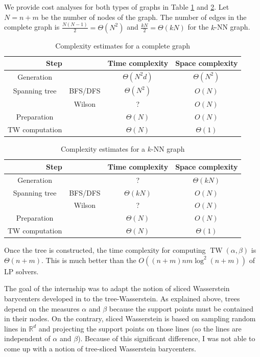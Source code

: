 \documentclass[12pt]{report}
\theoremstyle{definition}
\theoremstyle{remark}
\DeclareMathOperator{\tw}{TW}
\begin{document}
We provide cost analyses for both types of graphs in Table \ref{tab:2} and \ref{tab:3}. Let $N=n+m$ be the number of nodes of the graph. The number of edges in the complete graph is $\frac{N(N-1)}2=\Theta(N^2)$ and $\frac{kN}2=\Theta(kN)$ for the $k$-NN graph.

\begin{table}[H]
\centering
\begin{tabular}{|c|c|c|c|}
  \hline
    \multicolumn{2}{|c|}{Step} & Time complexity & Space complexity\\ \hline 
   Generation & & $\Theta(N^2d)$ & $\Theta(N^2)$\\
   Spanning tree & BFS/DFS & $\Theta(N^2)$ & $O(N)$ \\
    & Wilson & ? & $O(N)$ \\
    Preparation & & $\Theta(N)$ & $O(N)$\\
    TW computation & & $\Theta(N)$ & $\Theta(1)$\\
   \hline
\end{tabular}
\caption{Complexity estimates for a complete graph \label{tab:2}}
\end{table}

\begin{table}[H]
\centering
\begin{tabular}{|c|c|c|c|}
  \hline
    \multicolumn{2}{|c|}{Step} & Time complexity & Space complexity\\ \hline 
   Generation & & ? & $\Theta(kN)$\\
   Spanning tree & BFS/DFS & $\Theta(kN)$ & $O(N)$ \\
    & Wilson & ? & $O(N)$ \\
    Preparation & & $\Theta(N)$ & $O(N)$\\
    TW computation & & $\Theta(N)$ & $\Theta(1)$\\
   \hline
\end{tabular}
\caption{Complexity estimates for a $k$-NN graph \label{tab:3}}
\end{table}

Once the tree is constructed, the time complexity for computing $\tw(\alpha,\beta)$ is $\Theta(n+m)$. This is much better than the $O((n+m)nm \log^2(n+m))$ of LP solvers.
\\
\par The goal of the internship was to adapt the notion of sliced Wasserstein barycenters developed in \cite{bonneel2015sliced} to the tree-Wasserstein. As explained above, trees depend on the measures $\alpha$ and $\beta$ because the support points must be contained in their nodes. On the contrary, sliced Wasserstein is based on sampling random lines in $\mathbb R^d$ and projecting the support points on those lines (so the lines are independent of $\alpha$ and $\beta$). Because of this significant difference, I was not able to come up with a notion of tree-sliced Wasserstein barycenters.
\end{document}
